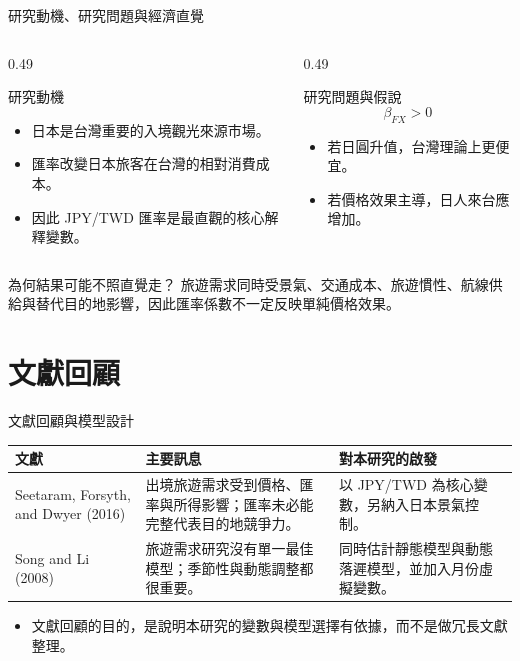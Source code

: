 \documentclass[aspectratio=169]{ctexbeamer}
\begin{document}
\begin{frame}{研究動機、研究問題與經濟直覺}
\begin{columns}[T]
  \begin{column}{0.49\textwidth}
    \begin{block}{研究動機}
    \begin{itemize}
      \item 日本是台灣重要的入境觀光來源市場。
      \item 匯率改變日本旅客在台灣的相對消費成本。
      \item 因此 JPY/TWD 匯率是最直觀的核心解釋變數。
    \end{itemize}
    \end{block}
  \end{column}
  \begin{column}{0.49\textwidth}
    \begin{block}{研究問題與假說}
    \[
    \beta_{FX}>0
    \]
    \begin{itemize}
      \item 若日圓升值，台灣理論上更便宜。
      \item 若價格效果主導，日人來台應增加。
    \end{itemize}
    \end{block}
  \end{column}
\end{columns}
\vspace{0.5em}
\begin{block}{為何結果可能不照直覺走？}
旅遊需求同時受景氣、交通成本、旅遊慣性、航線供給與替代目的地影響，因此匯率係數不一定反映單純價格效果。
\end{block}
\end{frame}

\section{文獻回顧}

\begin{frame}{文獻回顧與模型設計}
\small
\begin{tabularx}{\textwidth}{>{\raggedright\arraybackslash}p{} >{\raggedright\arraybackslash}X >{\raggedright\arraybackslash}p{}}
\toprule
文獻 & 主要訊息 & 對本研究的啟發 \\
\midrule
Seetaram, Forsyth, and Dwyer (2016) & 出境旅遊需求受到價格、匯率與所得影響；匯率未必能完整代表目的地競爭力。 & 以 JPY/TWD 為核心變數，另納入日本景氣控制。 \\
Song and Li (2008) & 旅遊需求研究沒有單一最佳模型；季節性與動態調整都很重要。 & 同時估計靜態模型與動態落遲模型，並加入月份虛擬變數。 \\
\bottomrule
\end{tabularx}
\vspace{0.4em}
\begin{itemize}
  \item 文獻回顧的目的，是說明本研究的變數與模型選擇有依據，而不是做冗長文獻整理。
\end{itemize}
\end{frame}
\end{document}
